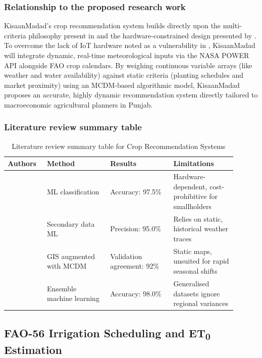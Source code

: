 \subsubsection{Relationship to the proposed research work}
KisaanMadad's crop recommendation system builds directly upon the multi-criteria philosophy present in \cite{bandara2022GIS} and the hardware-constrained design presented by \cite{ali2023towards}. To overcome the lack of IoT hardware noted as a vulnerability in \cite{udutalapally2021smart}, KisaanMadad will integrate dynamic, real-time meteorological inputs via the NASA POWER API alongside FAO crop calendars. By weighing continuous variable arrays (like weather and water availability) against static criteria (planting schedules and market proximity) using an MCDM-based algorithmic model, KisaanMadad proposes an accurate, highly dynamic recommendation system directly tailored to macroeconomic agricultural planners in Punjab.

\subsubsection{Literature review summary table}
\begin{table}[htbp]
  \centering
  \caption{Literature review summary table for Crop Recommendation Systems}
  \label{tab:crop_recommendation}
  \begin{tabular}{p{0.15\linewidth} p{0.25\linewidth} p{0.25\linewidth} p{0.25\linewidth}}
    \toprule
    \textbf{Authors} & \textbf{Method} & \textbf{Results} & \textbf{Limitations} \\
    \midrule
    \cite{udutalapally2021smart} & ML classification & Accuracy: 97.5\% & Hardware-dependent, cost-prohibitive for smallholders \\
    \cite{ali2023towards} & Secondary data ML & Precision: 95.0\% & Relies on static, historical weather traces \\
    \cite{bandara2022GIS} & GIS augmented with MCDM & Validation agreement: 92\% & Static maps, unsuited for rapid seasonal shifts \\
    \cite{kumar2023machine} & Ensemble machine learning & Accuracy: 98.0\% & Generalised datasets ignore regional variances \\
    \bottomrule
  \end{tabular}
\end{table}

\subsection{FAO-56 Irrigation Scheduling and ET\textsubscript{0} Estimation}

